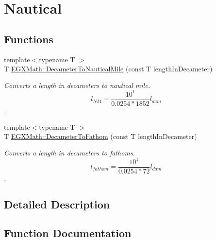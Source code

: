 \hypertarget{group___e_g_x_math-_conversions-_length_conversions-_decameter-_nautical}{}\section{Nautical}
\label{group___e_g_x_math-_conversions-_length_conversions-_decameter-_nautical}
\subsection*{Functions}
\begin{DoxyCompactItemize}
\item 
{\footnotesize template$<$typename T $>$ }\\T \mbox{\hyperlink{group___e_g_x_math-_conversions-_length_conversions-_decameter-_nautical_ga099c662953d7c82d538755bd699993b1}{E\+G\+X\+Math\+::\+Decameter\+To\+Nautical\+Mile}} (const T length\+In\+Decameter)
\begin{DoxyCompactList}\small\item\em Converts a length in decameters to nautical mile. \[ l_{NM}= \frac{10^{1}}{0.0254 * 1852} l_{dam} \]. \end{DoxyCompactList}\item 
{\footnotesize template$<$typename T $>$ }\\T \mbox{\hyperlink{group___e_g_x_math-_conversions-_length_conversions-_decameter-_nautical_ga26e58af8b0bdc9bfb22635741a498217}{E\+G\+X\+Math\+::\+Decameter\+To\+Fathom}} (const T length\+In\+Decameter)
\begin{DoxyCompactList}\small\item\em Converts a length in decameters to fathoms. \[ l_{fathom}= \frac{10^{1}}{0.0254 * 72} l_{dam} \]. \end{DoxyCompactList}\end{DoxyCompactItemize}


\subsection{Detailed Description}


\subsection{Function Documentation}
\mbox{\label{group___e_g_x_math-_conversions-_length_conversions-_decameter-_nautical_ga26e58af8b0bdc9bfb22635741a498217}} 
